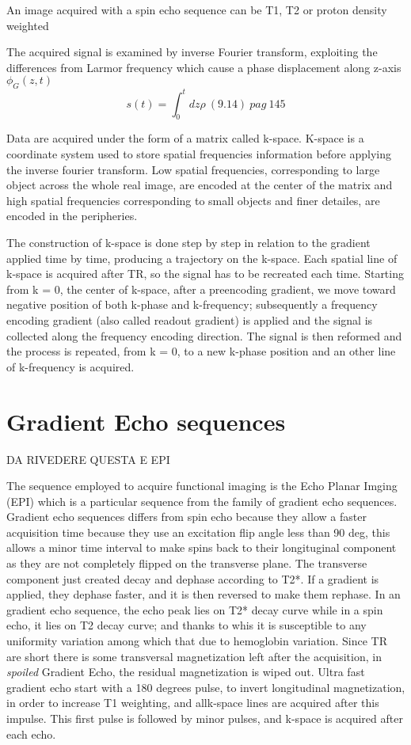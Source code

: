 \documentclass[10pt]{report}
\begin{document}
An image acquired with a spin echo sequence can be T1, T2 or proton density weighted

The acquired signal is examined by inverse Fourier transform, exploiting the differences from Larmor frequency which cause a phase displacement along z-axis $\phi_G(z, t)$
\begin{equation}
s(t) = \int_0^tdz\rho \ (9.14) \ pag \ 145
\end{equation}

Data are acquired under the form of a matrix called k-space.
K-space is a coordinate system used to store spatial frequencies information before applying the inverse fourier transform.
Low spatial frequencies, corresponding to large object across the whole real image, are encoded at the center of the matrix and high spatial frequencies corresponding to small objects and finer detailes, are encoded in the peripheries.

The construction of k-space is done step by step in relation to the gradient applied time by time, producing a trajectory on the k-space.
Each spatial line of k-space is acquired after TR, so the signal has to be recreated each time.
Starting from k = 0, the center of k-space, after a preencoding gradient, we move toward negative position of both k-phase and k-frequency; subsequently a frequency encoding gradient (also called readout gradient) is applied and the signal is collected along the frequency encoding direction.
The signal is then reformed and the process is repeated, from k = 0, to a new k-phase position and an other line of k-frequency is acquired.




\section{Gradient Echo sequences}
DA RIVEDERE QUESTA E EPI

The sequence employed to acquire functional imaging is the Echo Planar Imging (EPI) which is a particular sequence from the family of gradient echo sequences.
Gradient echo sequences differs from spin echo because they allow a faster acquisition time because they use an excitation flip angle less than 90 deg, this allows a minor time interval to make spins back to their longituginal component as they are not completely flipped on the transverse plane.
The transverse component just created decay and dephase according to T2*. If a gradient is applied, they dephase faster, and it is then reversed to make them rephase.
In an gradient echo sequence, the echo peak lies on T2* decay curve while in a spin echo, it lies on T2 decay curve; and thanks to whis it is susceptible to any uniformity variation among which that due to hemoglobin variation.
Since TR are short there is some transversal magnetization left after the acquisition, in \emph{spoiled} Gradient Echo, the residual magnetization is wiped out.
Ultra fast gradient echo start with a 180 degrees pulse, to invert longitudinal magnetization, in order to increase T1 weighting, and allk-space lines are acquired after this impulse. This first pulse is followed by minor pulses, and k-space is acquired after each echo.
\end{document}
